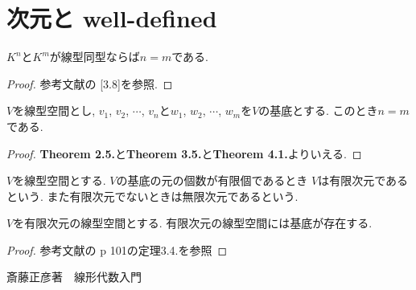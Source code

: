 \documentclass[11pt, a4paper, dvipdfmx]{jsarticle}
\theoremstyle{definition}
\newtheorem[S]{Def+}[Axiom+]{Definition}
\newtheorem[S]{Thm+}[Axiom+]{Theorem}
\newtheorem[S]{Prop+}[Axiom+]{Proposition}
\newtheorem[S]{Lemma+}[Axiom+]{Lemma}
\begin{document}
\section{次元と well-defined}
\begin{Thm+}
    $K^{n}$と$K^{m}$が線型同型ならば$n = m$である.
\end{Thm+}
\begin{proof}
    参考文献の [3.8]を参照.
\end{proof}
\begin{Thm+}[基底の個数の一意性]
    $V$を線型空間とし, $v_{1}$, $v_{2}$, $\cdots$, $v_{n}$と$w_{1}$, $w_{2}$, $\cdots$, $w_{m}$を$V$の基底とする. このとき$n = m$である.
\end{Thm+}
\begin{proof}
    {\bf Theorem 2.5.}と{\bf Theorem 3.5.}と{\bf Theorem 4.1.}よりいえる.
\end{proof}
\begin{Def+}[次元]
    $V$を線型空間とする. $V$の基底の元の個数が有限個であるとき
    $V$は有限次元であるという. また有限次元でないときは無限次元であるという.
\end{Def+}
\begin{Thm+}[有限次元の基底の存在性]
    $V$を有限次元の線型空間とする. 有限次元の線型空間には基底が存在する.
\end{Thm+}
\begin{proof}
    参考文献の p 101の定理3.4.を参照
\end{proof}
\begin{thebibliography}{1}
     斎藤正彦著　線形代数入門
\end{thebibliography}
\end{document}
